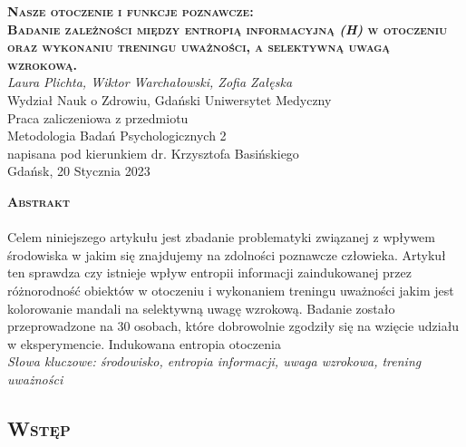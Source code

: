 \documentclass[12pt,a4paper,final,oneside,onecolumn,titlepage]{article}
\begin{document}
\pagestyle{fancy}
\fancyhead{}
\fancyfoot{}
\rhead{\thepage}

\begin{titlepage}
  \thispagestyle{empty}
  \rhead{\thepage}
  \begin{center}
  \vspace*{1cm}
  \Large
  \textbf{\textsc{Nasze otoczenie i funkcje poznawcze:\\ Badanie zależności między entropią informacyjną \textit{(H)} w otoczeniu oraz wykonaniu treningu uważności, a selektywną uwagą wzrokową.\\}}
  \vspace{1.5cm}
  \textit{Laura Plichta, Wiktor Warchałowski, Zofia Załęska\\}
  Wydział Nauk o Zdrowiu, Gdański Uniwersytet Medyczny\\
  \vspace{3cm}
  Praca zaliczeniowa z przedmiotu \\ Metodologia Badań Psychologicznych 2 \\ napisana pod kierunkiem dr. Krzysztofa Basińskiego\\
  \vspace{3cm}
  Gdańsk, 20 Stycznia 2023
  \end{center}
\end{titlepage}
\begin{center}
  \vspace*{0.5cm}
  \large{\textbf{\textsc{Abstrakt}}}
\end{center}
\paragraph{}
Celem niniejszego artykułu jest zbadanie problematyki związanej z wpływem środowiska w jakim się znajdujemy na zdolności poznawcze człowieka. Artykuł ten sprawdza czy istnieje wpływ entropii informacji zaindukowanej przez różnorodność obiektów w otoczeniu i wykonaniem treningu uważności jakim jest kolorowanie mandali na selektywną uwagę wzrokową. Badanie zostało przeprowadzone na 30 osobach, które dobrowolnie zgodziły się na wzięcie udziału w eksperymencie. Indukowana entropia otoczenia
\\
\textit{Słowa kluczowe: środowisko, entropia informacji, uwaga wzrokowa, trening uważności}
\newpage
\begin{center}
\section*{\large{\textbf{\textsc{Wstęp}}}}
\end{center}
\end{document}
